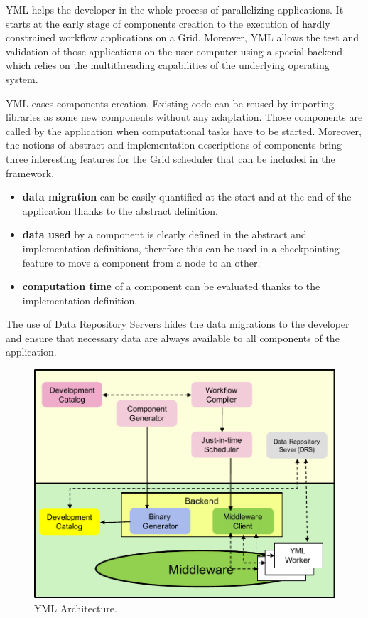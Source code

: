 YML helps the developer in the whole process of parallelizing applications. It starts at the early stage of components creation to the execution of hardly constrained workflow applications on a Grid. Moreover, YML allows the test and validation of those applications on the user computer using a special backend which relies on the multithreading capabilities of the underlying operating system.

YML eases components creation. Existing code can be reused by importing libraries as some new components without any adaptation. Those components are called by the application when computational tasks have to be started. Moreover, the notions of abstract and implementation descriptions of components bring three interesting features for the Grid scheduler that can be included in the framework.

\begin{itemize}
	\item \textbf{data migration} can be easily quantified at the start and at the end of the application thanks to the abstract definition.
	\item \textbf{data used} by a component is clearly defined in the abstract and implementation definitions, therefore this can be used in a checkpointing feature to move a component from a node to an other.
	\item \textbf{computation time} of a component can be evaluated thanks to the implementation definition.
\end{itemize}

The use of Data Repository Servers hides the data migrations to the developer and ensure that necessary data are always available to all components of the application.

\begin{figure}[htbp]
	\centering
	\includegraphics[width=.92\linewidth]{fig/yml-arch.pdf}
	\caption{YML Architecture.}
	\label{yml-arch}
\end{figure}

